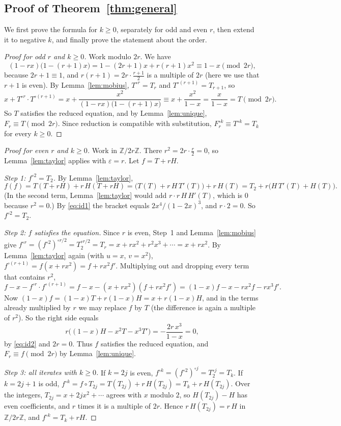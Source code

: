 \documentclass[11pt,a4paper]{article}
\theoremstyle{definition}
\theoremstyle{remark}
\newcommand{\Z}{\mathbb{Z}}
\begin{document}
\subsection{Proof of Theorem~\ref{thm:general}}

We first prove the formula for $k\ge0$, separately for odd and even $r$, then extend it to negative $k$, and finally
prove the statement about the order.

\begin{proof}[Proof for odd $r$ and $k\ge0$]
Work modulo $2r$. We have
\[
(1-rx)\bigl(1-(r+1)x\bigr)=1-(2r+1)x+r(r+1)x^2\equiv1-x\pmod{2r},
\]
because $2r+1\equiv1$, and $r(r+1)=2r\cdot\frac{r+1}{2}$ is a multiple of $2r$ (here we use that $r+1$ is even). By
Lemma~\ref{lem:mobius}, $T^{\circ r}=T_r$ and $T^{\circ(r+1)}=T_{r+1}$, so
\[
x+T^{\circ r}\cdot T^{\circ(r+1)}=x+\frac{x^2}{(1-rx)\bigl(1-(r+1)x\bigr)}\equiv x+\frac{x^2}{1-x}=\frac{x}{1-x}=T\pmod{2r}.
\]
So $T$ satisfies the reduced equation, and by Lemma~\ref{lem:unique}, $F_r\equiv T\pmod{2r}$. Since reduction is
compatible with substitution, $F_r^{\circ k}\equiv T^{\circ k}=T_k$ for every $k\ge0$.
\end{proof}

\begin{proof}[Proof for even $r$ and $k\ge0$]
Work in $\Z/2r\Z$. There $r^2=2r\cdot\frac r2=0$, so Lemma~\ref{lem:taylor} applies with $\varepsilon=r$. Let
$f=T+rH$.

\emph{Step 1: $f^{\circ2}=T_2$.} By Lemma~\ref{lem:taylor},
\[
f(f)=T(T+rH)+r\,H(T+rH)=\bigl(T(T)+r\,H\,T'(T)\bigr)+r\,H(T)=T_2+r\bigl(H\,T'(T)+H(T)\bigr).
\]
(In the second term, Lemma~\ref{lem:taylor} would add $r\cdot r\,H\,H'(T)$, which is $0$ because $r^2=0$.) By
\eqref{eq:id1} the bracket equals $2x^4/(1-2x)^3$, and $r\cdot2=0$. So $f^{\circ2}=T_2$.

\emph{Step 2: $f$ satisfies the equation.} Since $r$ is even, Step~1 and Lemma~\ref{lem:mobius} give
$f^{\circ r}=(f^{\circ2})^{\circ r/2}=T_2^{\circ r/2}=T_r=x+rx^2+r^2x^3+\cdots=x+rx^2$. By Lemma~\ref{lem:taylor} again
(with $u=x$, $v=x^2$), $f^{\circ(r+1)}=f(x+rx^2)=f+rx^2f'$. Multiplying out and dropping every term that contains
$r^2$,
\[
f-x-f^{\circ r}\cdot f^{\circ(r+1)}=f-x-(x+rx^2)(f+rx^2f')=(1-x)f-x-rx^2f-rx^3f'.
\]
Now $(1-x)f=(1-x)T+r(1-x)H=x+r(1-x)H$, and in the terms already multiplied by $r$ we may replace $f$ by $T$ (the
difference is again a multiple of $r^2$). So the right side equals
\[
r\bigl((1-x)H-x^2T-x^3T'\bigr)=-\frac{2r\,x^3}{1-x}=0,
\]
by \eqref{eq:id2} and $2r=0$. Thus $f$ satisfies the reduced equation, and $F_r\equiv f\pmod{2r}$ by
Lemma~\ref{lem:unique}.

\emph{Step 3: all iterates with $k\ge0$.} If $k=2j$ is even, $f^{\circ k}=(f^{\circ 2})^{\circ j}=T_2^{\circ j}=T_k$.
If $k=2j+1$ is odd, $f^{\circ k}=f\circ T_{2j}=T(T_{2j})+r\,H(T_{2j})=T_k+r\,H(T_{2j})$. Over the integers,
$T_{2j}=x+2jx^2+\cdots$ agrees with $x$ modulo $2$, so $H(T_{2j})-H$ has even coefficients, and $r$ times it is a
multiple of $2r$. Hence $r\,H(T_{2j})=r\,H$ in $\Z/2r\Z$, and $f^{\circ k}=T_k+rH$.
\end{proof}
\end{document}

